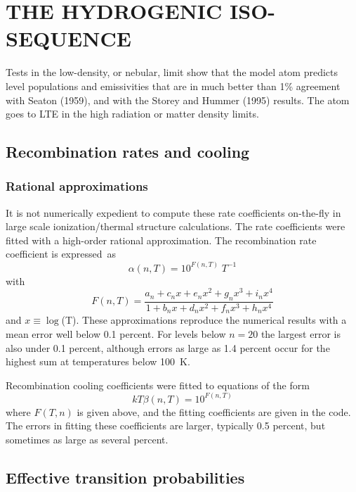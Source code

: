 \chapter{THE HYDROGENIC ISO-SEQUENCE}

Tests in the low-density, or nebular, limit show that the model atom predicts
level populations and emissivities that are in much better than 1\% agreement
with Seaton (1959), and with the Storey and Hummer (1995) results.  The
atom goes to LTE in the high radiation or matter density limits.

\section{Recombination rates and cooling}

\subsection{Rational approximations}%

It is not numerically expedient to compute these rate coefficients on-the-fly
in large scale ionization/thermal structure calculations.  The rate
coefficients were fitted with a high-order rational approximation.  The
recombination rate coefficient is expressed~as
\begin{equation}
\alpha \left( {n,T} \right) = {10^{F(n,T)}}\;{T^{ - 1}}
\end{equation}
with
\begin{equation}
F(n,T) = \frac{{{a_n} + {c_n}x + {e_n}{x^2} + {g_n}{x^3} + {i_n}{x^4}}}{{1
+ {b_n}x + {d_n}{x^2} + {f_n}{x^3} + {h_n}{x^4}}}
\end{equation}
and $x \equiv \log$(T).  These approximations reproduce the numerical results with
a mean error well below 0.1 percent.  For levels below $n=20$ the largest
error is also under 0.1 percent, although errors as large as 1.4 percent
occur for the highest sum at temperatures below 100~K.

Recombination cooling coefficients were fitted to equations of the form
\begin{equation}
kT\beta \left( {n,T} \right) = {10^{F(n,T)}}
\end{equation}
where $F(T,n)$ is given above, and the fitting coefficients are given in the
code.  The errors in fitting these coefficients are larger, typically 0.5
percent, but sometimes as large as several percent.

\section{Effective transition probabilities}

